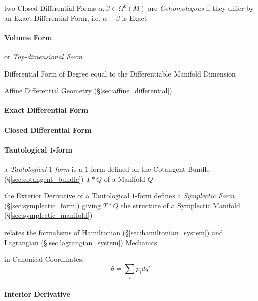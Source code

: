 {two Closed Differential Forms $\alpha, \beta \in \Omega^k(M)$ are
\emph{Cohomologous} if they differ by an Exact Differential Form, i.e.
$\alpha - \beta$ is Exact



\paragraph{Volume Form}\label{sec:volume_form}\hfill

or \emph{Top-dimensional Form}

Differential Form of Degree equal to the Differentiable Manifold Dimension

\fist Affine Differential Geometry (\S\ref{sec:affine_differential})



\paragraph{Exact Differential Form}\label{sec:exact_differential_form}\hfill

\paragraph{Closed Differential Form}\label{sec:closed_differential_form}\hfill

\paragraph{Tautological $1$-form}\label{sec:tautological_1form}\hfill

a \emph{Tautological $1$-form} is a $1$-form defined on the Cotangent Bundle
(\S\ref{sec:cotangent_bundle}) $T * Q$ of a Manifold $Q$

the Exterior Derivative of a Tautological $1$-form defines a \emph{Symplectic
  Form} (\S\ref{sec:symplectic_form}) giving $T * Q$ the structure of a
Symplectic Manifold (\S\ref{sec:symplectic_manifold})

relates the formalisms of Hamiltonian (\S\ref{sec:hamiltonian_system}) and
Lagrangian (\S\ref{sec:lagrangian_system}) Mechanics

in Canonical Coordinates:
\[
  \theta = \sum_i p_i dq^i
\]



\paragraph{Interior Derivative}\label{sec:interior_derivative}\hfill

}
